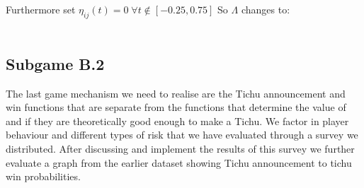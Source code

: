 Furthermore set $\eta_{ij}(t)=0\;\forall t\not\in [-0.25, 0.75]$
So $\Lambda$ changes to:
\\ \\
\noindent{}

\subsection{Subgame B.2}
The last game mechanism we need to realise are the Tichu announcement and win functions that are separate from the functions that determine the value of and if they are theoretically good enough to make a Tichu. We factor in player behaviour and different types of risk that we have evaluated through a survey we distributed. After discussing and  implement the results of  this survey we further evaluate a graph from the earlier dataset showing Tichu announcement to tichu win probabilities. 

